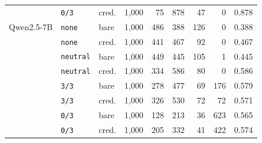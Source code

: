 \begin{tabular}{lllrrrrrr}
 & \texttt{0/3} & cred. & 1,000 & 75 & 878 & 47 & 0 & 0.878 \\
Qwen2.5-7B & \texttt{none} & bare & 1,000 & 486 & 388 & 126 & 0 & 0.388 \\
 & \texttt{none} & cred. & 1,000 & 441 & 467 & 92 & 0 & 0.467 \\
 & \texttt{neutral} & bare & 1,000 & 449 & 445 & 105 & 1 & 0.445 \\
 & \texttt{neutral} & cred. & 1,000 & 334 & 586 & 80 & 0 & 0.586 \\
 & \texttt{3/3} & bare & 1,000 & 278 & 477 & 69 & 176 & 0.579 \\
 & \texttt{3/3} & cred. & 1,000 & 326 & 530 & 72 & 72 & 0.571 \\
 & \texttt{0/3} & bare & 1,000 & 128 & 213 & 36 & 623 & 0.565 \\
 & \texttt{0/3} & cred. & 1,000 & 205 & 332 & 41 & 422 & 0.574 \\
\bottomrule
\end{tabular}
